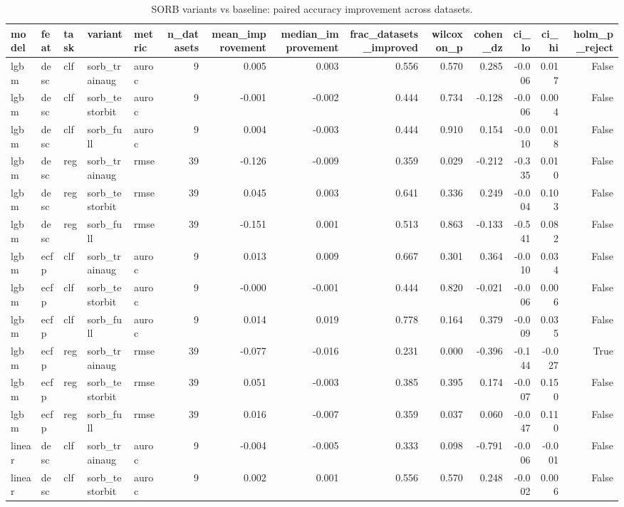 \begin{table}
\caption{SORB variants vs baseline: paired accuracy improvement across datasets.}
\label{tab:table3_method}
\begin{tabular}{lllllrrrrrrrrr}
\toprule
model & feat & task & variant & metric & n\_datasets & mean\_improvement & median\_improvement & frac\_datasets\_improved & wilcoxon\_p & cohen\_dz & ci\_lo & ci\_hi & holm\_p\_reject \\
\midrule
lgbm & desc & clf & sorb\_trainaug & auroc & 9 & 0.005 & 0.003 & 0.556 & 0.570 & 0.285 & -0.006 & 0.017 & False \\
lgbm & desc & clf & sorb\_testorbit & auroc & 9 & -0.001 & -0.002 & 0.444 & 0.734 & -0.128 & -0.006 & 0.004 & False \\
lgbm & desc & clf & sorb\_full & auroc & 9 & 0.004 & -0.003 & 0.444 & 0.910 & 0.154 & -0.010 & 0.018 & False \\
lgbm & desc & reg & sorb\_trainaug & rmse & 39 & -0.126 & -0.009 & 0.359 & 0.029 & -0.212 & -0.335 & 0.010 & False \\
lgbm & desc & reg & sorb\_testorbit & rmse & 39 & 0.045 & 0.003 & 0.641 & 0.336 & 0.249 & -0.004 & 0.103 & False \\
lgbm & desc & reg & sorb\_full & rmse & 39 & -0.151 & 0.001 & 0.513 & 0.863 & -0.133 & -0.541 & 0.082 & False \\
lgbm & ecfp & clf & sorb\_trainaug & auroc & 9 & 0.013 & 0.009 & 0.667 & 0.301 & 0.364 & -0.010 & 0.034 & False \\
lgbm & ecfp & clf & sorb\_testorbit & auroc & 9 & -0.000 & -0.001 & 0.444 & 0.820 & -0.021 & -0.006 & 0.006 & False \\
lgbm & ecfp & clf & sorb\_full & auroc & 9 & 0.014 & 0.019 & 0.778 & 0.164 & 0.379 & -0.009 & 0.035 & False \\
lgbm & ecfp & reg & sorb\_trainaug & rmse & 39 & -0.077 & -0.016 & 0.231 & 0.000 & -0.396 & -0.144 & -0.027 & True \\
lgbm & ecfp & reg & sorb\_testorbit & rmse & 39 & 0.051 & -0.003 & 0.385 & 0.395 & 0.174 & -0.007 & 0.150 & False \\
lgbm & ecfp & reg & sorb\_full & rmse & 39 & 0.016 & -0.007 & 0.359 & 0.037 & 0.060 & -0.047 & 0.110 & False \\
linear & desc & clf & sorb\_trainaug & auroc & 9 & -0.004 & -0.005 & 0.333 & 0.098 & -0.791 & -0.006 & -0.001 & False \\
linear & desc & clf & sorb\_testorbit & auroc & 9 & 0.002 & 0.001 & 0.556 & 0.570 & 0.248 & -0.002 & 0.006 & False \\

\end{tabular}
\end{table}

